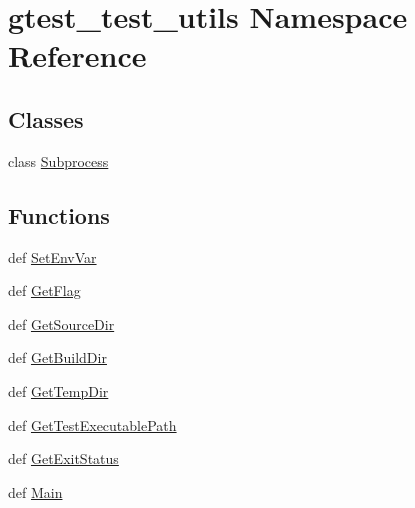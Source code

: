 \hypertarget{namespacegtest__test__utils}{\section{gtest\-\_\-test\-\_\-utils Namespace Reference}
\label{namespacegtest__test__utils}
}
\subsection*{Classes}
\begin{DoxyCompactItemize}
\item 
class \hyperlink{classgtest__test__utils_1_1_subprocess}{Subprocess}
\end{DoxyCompactItemize}
\subsection*{Functions}
\begin{DoxyCompactItemize}
\item 
def \hyperlink{namespacegtest__test__utils_aa5ede4c887af3c0d837def05f33b4a5b}{Set\-Env\-Var}
\item 
def \hyperlink{namespacegtest__test__utils_a406e375483e21bcd8f6487467c70bf43}{Get\-Flag}
\item 
def \hyperlink{namespacegtest__test__utils_a61bdad46f079ed13d9102f8a8c13ea18}{Get\-Source\-Dir}
\item 
def \hyperlink{namespacegtest__test__utils_a69139a9ca084ed1cc641897636a57fad}{Get\-Build\-Dir}
\item 
def \hyperlink{namespacegtest__test__utils_a35879a886810d885b57577e813d3a333}{Get\-Temp\-Dir}
\item 
def \hyperlink{namespacegtest__test__utils_a1bdf3cac86afa675ed37629b183048e9}{Get\-Test\-Executable\-Path}
\item 
def \hyperlink{namespacegtest__test__utils_a8ff3a0bbcfecd0e0a8b3d102cb31f327}{Get\-Exit\-Status}
\item 
def \hyperlink{namespacegtest__test__utils_afffc1389d4e3b153f1a37715aced37a5}{Main}
\end{DoxyCompactItemize}
